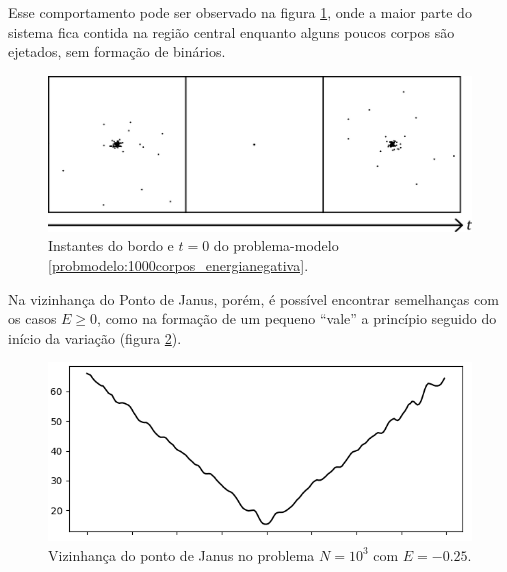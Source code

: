 Esse comportamento pode ser observado na figura \ref{fig:1000corpos_energianegativa_posicoes}, onde a maior parte do sistema fica contida na região central enquanto alguns poucos corpos são ejetados, sem formação de binários.

\begin{figure}[H]
    \centering
    \includegraphics[width=0.8\linewidth]{tcc//img/espalhamento_energia_negativa_1000.png}
    \caption{Instantes do bordo e $t=0$ do problema-modelo \ref{probmodelo:1000corpos_energianegativa}.}
    \label{fig:1000corpos_energianegativa_posicoes}
\end{figure}

Na vizinhança do Ponto de Janus, porém, é possível encontrar semelhanças com os casos $E \geq 0$, como na formação de um pequeno ``vale'' a princípio seguido do início da variação (figura \ref{fig:1000corpos_energianegativa_complexidade_zoom}).

\begin{figure}[H]
    \centering
    \includegraphics[width=0.8\linewidth]{tcc/img/zoom_complexidade_1000corpos_negativa.png}
    \caption{Vizinhança do ponto de Janus no problema $N=10^3$ com $E=-0.25$.}
    \label{fig:1000corpos_energianegativa_complexidade_zoom}
\end{figure}